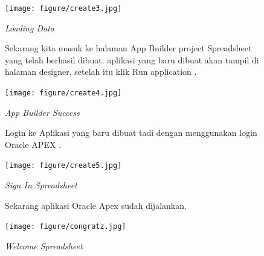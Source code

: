 \begin{enumerate}
\begin{figure}
    \begin{center}
\texttt{[image: figure/create3.jpg]}
    \caption{\textit{Loading Data}}
        \end{center}
\label{gambar}
\end{figure}

\begin{figure}
\item Sekarang kita masuk ke halaman App Builder project Spreadsheet yang telah berhasil dibuat. aplikasi yang baru dibuat akan tampil di halaman designer, setelah itu klik Run application .

    \begin{center}
\texttt{[image: figure/create4.jpg]}
    \caption{\textit{App Builder Success}}
        \end{center}
\label{gambar}
\end{figure}

\begin{figure}
\item Login ke Aplikasi yang baru dibuat tadi dengan menggunakan login Oracle APEX .

    \begin{center}
\texttt{[image: figure/create5.jpg]}
    \caption{\textit{Sign In Spreadsheet}}
        \end{center}
\label{gambar}
\end{figure}

\begin{figure}
\item Sekarang aplikasi Oracle Apex sudah dijalankan.

    \begin{center}
\texttt{[image: figure/congratz.jpg]}
    \caption{\textit{Welcome Spreadsheet}}
        \end{center}
\label{gambar}
\end{figure}

\end{enumerate}

 